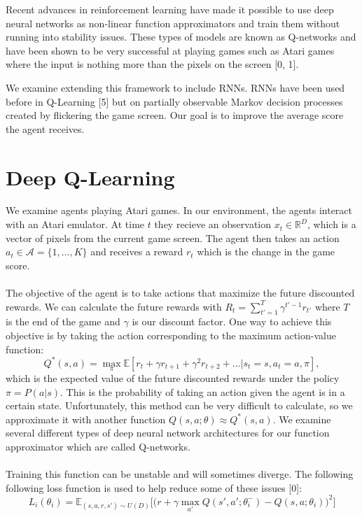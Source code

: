 \documentclass{article}
\begin{document}
Recent advances in reinforcement learning have made it possible to use deep
neural networks as non-linear function approximators and train them without
running into stability issues. These types of models are known as Q-networks and
have been shown to be very successful at playing games such as Atari games where
the input is nothing more than the pixels on the screen [0, 1].

We examine extending this framework to include RNNs. RNNs have been used before
in Q-Learning [5] but on partially observable Markov decision processes created
by flickering the game screen. Our goal is to improve the average score the agent
receives.

\section{Deep Q-Learning}

We examine agents playing Atari games. In our environment, the agents interact with
an Atari emulator. At time $t$ they recieve an observation $x_t \in \mathbb{R}^D$,
which is a vector of pixels from the current game screen. The agent then takes an
action $a_t \in \mathcal{A} = \{1, \dots, K\}$ and receives a reward $r_t$ which
is the change in the game score. \\
\\
The objective of the agent is to take actions that maximize the future discounted
rewards. We can calculate the future rewards with $R_t = \sum_{t' = 1}^T \gamma^{t'-1}r_{t'}$
where $T$ is the end of the game and $\gamma$ is our discount factor. One way
to achieve this objective is by taking the action corresponding to the maximum
action-value function:
$$Q^*(s,a) = \max_{\pi}\mathbb{E}[r_t + \gamma r_{t+1} + \gamma^2 r_{t+2} + \dots
|s_t = s, a_t = a, \pi],$$
which is the expected value of the future discounted rewards under the policy
$\pi = P(a|s)$. This is the probability of taking an action given the agent is in a
certain state. Unfortunately, this method can be very difficult to calculate,
so we approximate it with another function $Q(s,a;\theta) \approx Q^*(s,a)$. We
examine several different types of deep neural network architectures for our
function approximator which are called Q-networks. \\
\\
Training this function can be unstable and will sometimes diverge. The following
following loss function is used to help reduce some of these issues [0]:
\begin{equation}
    L_i(\theta_i) = \mathbb{E}_{(s,a,r,s') \sim U(D)}\Big[\Big(
    r + \gamma \max_{a'}Q(s',a';\theta_i^-) - Q(s,a;\theta_i)\Big)^2\Big]
\end{equation}
\end{document}
